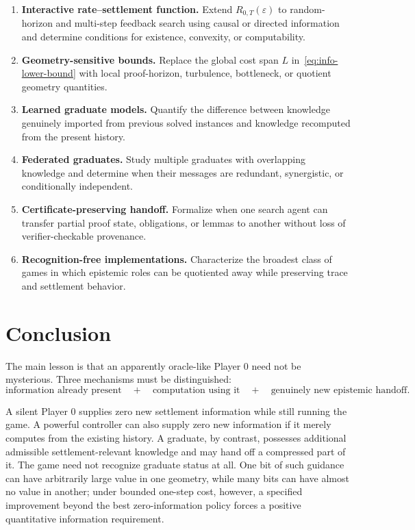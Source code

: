 \documentclass[11pt]{article}
\theoremstyle{definition}
\begin{document}
\begin{enumerate}[label=\textbf{O\arabic*.}]
\item \textbf{Interactive rate--settlement function.}  Extend $R_{0,T}(\varepsilon)$ to random-horizon and multi-step feedback search using causal or directed information and determine conditions for existence, convexity, or computability.

\item \textbf{Geometry-sensitive bounds.}  Replace the global cost span $L$ in~\eqref{eq:info-lower-bound} with local proof-horizon, turbulence, bottleneck, or quotient geometry quantities.

\item \textbf{Learned graduate models.}  Quantify the difference between knowledge genuinely imported from previous solved instances and knowledge recomputed from the present history.

\item \textbf{Federated graduates.}  Study multiple graduates with overlapping knowledge and determine when their messages are redundant, synergistic, or conditionally independent.

\item \textbf{Certificate-preserving handoff.}  Formalize when one search agent can transfer partial proof state, obligations, or lemmas to another without loss of verifier-checkable provenance.

\item \textbf{Recognition-free implementations.}  Characterize the broadest class of games in which epistemic roles can be quotiented away while preserving trace and settlement behavior.
\end{enumerate}

\section{Conclusion}

The main lesson is that an apparently oracle-like Player 0 need not be mysterious.  Three mechanisms must be distinguished:
\[
\boxed{
\text{information already present}
\quad+\quad
\text{computation using it}
\quad+\quad
\text{genuinely new epistemic handoff}.
}
\]

A silent Player 0 supplies zero new settlement information while still running the game.  A powerful controller can also supply zero new information if it merely computes from the existing history.  A graduate, by contrast, possesses additional admissible settlement-relevant knowledge and may hand off a compressed part of it.  The game need not recognize graduate status at all.  One bit of such guidance can have arbitrarily large value in one geometry, while many bits can have almost no value in another; under bounded one-step cost, however, a specified improvement beyond the best zero-information policy forces a positive quantitative information requirement.
\end{document}

